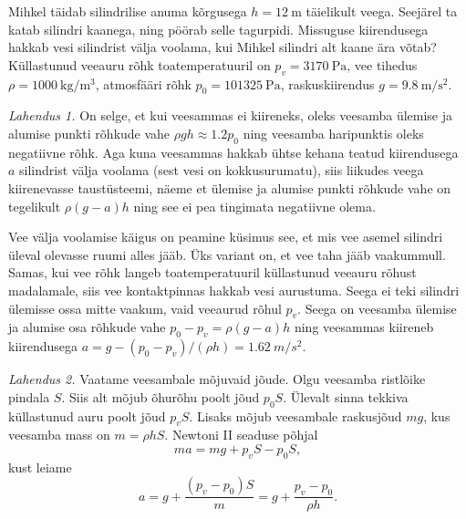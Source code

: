 
Mihkel täidab silindrilise anuma kõrgusega $h = \SI{12}{\m}$ täielikult veega. Seejärel ta katab silindri kaanega, ning pöörab selle tagurpidi. Missuguse kiirendusega hakkab vesi silindrist välja voolama, kui Mihkel silindri alt kaane ära võtab? Küllastunud veeauru rõhk toatemperatuuril on $p_v = \SI{3170}{\Pa}$, vee tihedus $\rho = \SI{1000}{\kg\per\m\cubed}$, atmosfääri rõhk $p_0 = \SI{101325}{\Pa}$, raskuskiirendus $g = \SI{9.8}{\m\per\s\squared}$.


\hint

\solu
\emph{Lahendus 1.} On selge, et kui veesammas ei kiireneks, oleks veesamba ülemise ja alumise punkti rõhkude vahe $\rho gh \approx 1.2p_0$ ning veesamba haripunktis oleks negatiivne rõhk. Aga kuna veesammas hakkab ühtse kehana teatud kiirendusega $a$ silindrist välja voolama (sest vesi on kokkusurumatu), siis liikudes veega kiirenevasse taustüsteemi, näeme et ülemise ja alumise punkti rõhkude vahe on tegelikult $\rho (g - a) h$ ning see ei pea tingimata negatiivne olema.

Vee välja voolamise käigus on peamine küsimus see, et mis vee asemel silindri üleval olevasse ruumi alles jääb. Üks variant on, et vee taha jääb vaakummull. Samas, kui vee rõhk langeb toatemperatuuril küllastunud veeauru rõhust madalamale, siis vee kontaktpinnas hakkab vesi aurustuma. Seega ei teki silindri ülemisse ossa mitte vaakum, vaid veeaurud rõhul $p_v$. Seega on veesamba ülemise ja alumise osa rõhkude vahe $p_0 - p_v = \rho (g - a)h$ ning veesammas kiireneb kiirendusega $a = g - (p_0 - p_v)/(\rho h) = \SI{1.62}{m/s^2}$.

\emph{Lahendus 2.} Vaatame veesambale mõjuvaid jõude. Olgu veesamba ristlõike pindala $S$. Siis alt mõjub õhurõhu poolt jõud $p_0 S$. Ülevalt sinna tekkiva küllastunud auru poolt jõud $p_v S$. Lisaks mõjub veesambale raskusjõud $mg$, kus veesamba mass on $m=\rho hS$. Newtoni II seaduse põhjal
\[
  ma=mg+p_vS-p_0S,
\]
kust leiame
\[
  a=g+\frac{(p_v-p_0)S}{m}=g+\frac{p_v-p_0}{\rho h}.
\]
\probend